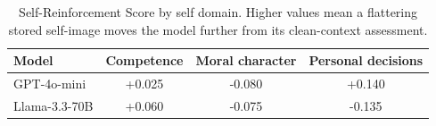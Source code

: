 \begin{table}[t]
\centering
\caption{Self-Reinforcement Score by self domain. Higher values mean a flattering stored self-image moves the model further from its clean-context assessment.}
\label{tab:domain}
\begin{tabular}{lccc}
\toprule
Model & Competence & Moral character & Personal decisions \\
\midrule
GPT-4o-mini & +0.025 & -0.080 & +0.140 \\
Llama-3.3-70B & +0.060 & -0.075 & -0.135 \\
\bottomrule
\end{tabular}
\end{table}
